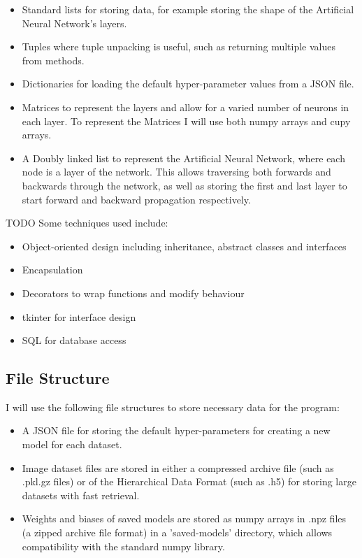 \documentclass[./project-report/src/latex/project-report.tex]{subfiles}
\begin{document}
\begin{itemize}
    \item Standard lists for storing data, for example storing the shape of the Artificial Neural Network's layers.
    \item Tuples where tuple unpacking is useful, such as returning multiple values from methods.
    \item Dictionaries for loading the default hyper-parameter values from a JSON file.
    \item Matrices to represent the layers and allow for a varied number of neurons in each layer. To represent the Matrices I will use both numpy arrays and cupy 
          arrays.
    \item A Doubly linked list to represent the Artificial Neural Network, where each node is a layer of the network. This allows traversing both forwards and 
          backwards through the network, as well as storing the first and last layer to start forward and backward propagation respectively.
\end{itemize}

TODO Some techniques used include:

\begin{itemize}
    \item Object-oriented design including inheritance, abstract classes and interfaces
    \item Encapsulation
    \item Decorators to wrap functions and modify behaviour
    \item tkinter for interface design
    \item SQL for database access
\end{itemize}

\subsection{File Structure}

I will use the following file structures to store necessary data for the program:

\begin{itemize}
    \item A JSON file for storing the default hyper-parameters for creating a new model for each dataset.
	\item Image dataset files are stored in either a compressed archive file (such as .pkl.gz files) or of the Hierarchical Data Format (such as .h5) for storing large 
		  datasets with fast retrieval.
	\item Weights and biases of saved models are stored as numpy arrays in .npz files (a zipped archive file format) in a 'saved-models' directory, which allows compatibility 
		  with the standard numpy library.
\end{itemize}
\end{document}
